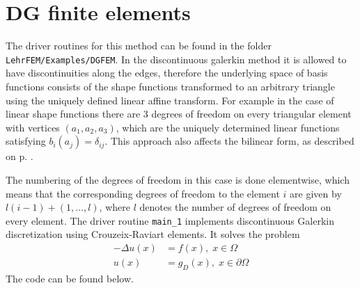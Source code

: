 \section{DG finite elements}

The driver routines for this method can be found in the folder \texttt{LehrFEM/Examples/DGFEM}. In the discontinuous galerkin method it is allowed to have discontinuities along the edges, therefore the underlying space of basis functions consists of the shape functions transformed to an arbitrary triangle using the uniquely defined linear affine transform. For example in the case of linear shape functions there are 3 degrees of freedom on every triangular element with vertices $(a_1,a_2,a_3)$, which are the uniquely determined linear functions satisfying $b_i(a_j)=\delta_{ij}$. This approach also affects the bilinear form, as described on p. \pageref{ssec:dg}.

The numbering of the degrees of freedom in this case is done elementwise, which means that the corresponding degrees of freedom to the element $i$ are given by $l(i-1)+(1,\ldots, l)$, where $l$ denotes the number of degrees of freedom on every element. The driver routine \texttt{main\_1} implements discontinuous Galerkin discretization using Crouzeix-Raviart elements. It solves the problem
\begin{align*}
 -\Delta u(x) &= f(x), \; x\in \Omega \\
 u(x) &= g_D(x), \; x\in \partial \Omega
\end{align*}
The code can be found below.

